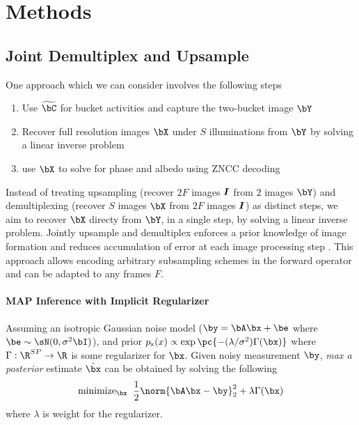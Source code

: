 \documentclass[../writeup.tex]{subfiles}
\begin{document}
  


\section{Methods}


\subsection{Joint Demultiplex and Upsample}

One approach which we can consider involves the following steps
\begin{enumerate}
    \item Use $\widetilde{\bC}$ for bucket activities and capture the two-bucket image $\bY$
    \item Recover full resolution images $\bX$ under $S$ illuminations from $\bY$ by solving a linear inverse problem
    \item use $\bX$ to solve for phase and albedo using ZNCC decoding \cite{mirdehghanOptimalStructuredLight2018}
\end{enumerate}
Instead of treating upsampling (recover $2F$ images $\boldsymbol{I}$ from $2$ images $\bY$) and demultiplexing (recover $S$ images $\bX$ from $2F$ images $\boldsymbol{I}$) as distinct steps, we aim to recover $\bX$ directy from $\bY$, in a single step, by solving a linear inverse problem. Jointly upsample and demultiplex enforces a prior knowledge of image formation and reduces accumulation of error at each image processing step \cite{heideFlexISPFlexibleCamera2014}. This approach allows encoding arbitrary subsampling schemes in the forward operator and can be adapted to any frames $F$. 

\paragraph{MAP Inference with Implicit Regularizer}
Assuming an isotropic Gaussian noise model ($\by=\bA\bx + \be$ where $\be\sim \sN(0,\sigma^2 \bI)$), and prior $p_{\rx}(x) \propto \exp\pc{- (\lambda/\sigma^2) \Gamma(\bx) }$ where $\Gamma:\R^{SP}\to\R$ is some regularizer for $\bx$. Given noisy measurement $\by$, \textit{max a posterior} estimate $\hat{\bx}$ can be obtained by solving the following
\begin{align}
    \text{minimize}_{\bx}\;\;
        \frac{1}{2} \norm{\bA\bx-\by}_2^2 + \lambda \Gamma(\bx)
    \label{eq:generic_prior_inverse_problem}
\end{align}
where $\lambda$ is weight for the regularizer. 
\end{document}
